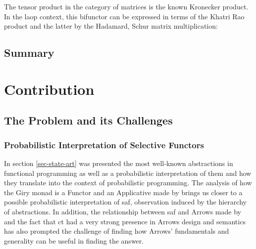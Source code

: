 \documentclass[
  oneside,
  11pt, a4paper,
  footinclude=true,
  headinclude=true,
  cleardoublepage=empty
]{scrbook}
\theoremstyle{definition}
\theoremstyle{definition}
\begin{document}
        The tensor product in the category of matrices is the known Kronecker product. In the \gls{laop} context, this bifunctor can be expressed in terms of the Khatri Rao product and the latter by the Hadamard, Schur matrix multiplication:
    
        \begin{center}
        \end{center}{}
        
    
    \section{Summary}
    
    \chapter{Contribution}\label{sec-current-work}
    
	\section{The Problem and its Challenges}\label{ch-problem}
	
	\subsection{Probabilistic Interpretation of Selective Functors}
	
	In section \ref{sec-state-art} was presented the most well-known abstractions in functional programming as well as a probabilistic interpretation of them and how they translate into the context of probabilistic programming. The analysis of how the Giry monad \citep{giry1982} is a Functor and an Applicative made by \cite{jtobin} brings us closer to a possible probabilistic interpretation of \gls{saf}, observation induced by the hierarchy of abstractions. In addition, the relationship between \gls{saf} and Arrows made by \cite{andrey2019selective} and the fact that \gls{ct} had a very strong presence in Arrows design and semantics has also prompted the challenge of finding how Arrows' fundamentals and generality can be useful in finding the answer.
\end{document}
